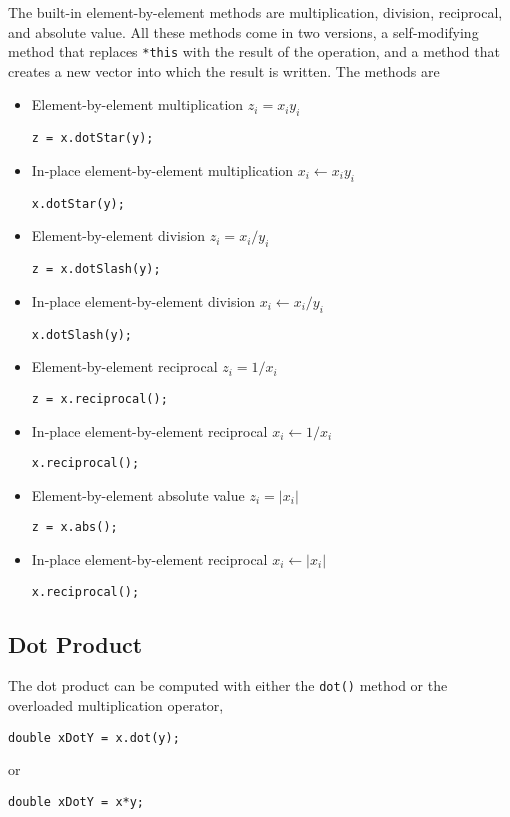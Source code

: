 \documentclass[12pt,relax]{SANDreport}
\begin{document}
The built-in element-by-element methods are multiplication, division, 
reciprocal, and absolute value. All these methods come in two versions, a
self-modifying method that replaces \verb+*this+ with the result of the 
operation, and a method that creates a new vector into which the result is
written. 
The methods are
\begin{itemize}
\item Element-by-element multiplication $z_i = x_i y_i$ 
\begin{verbatim}
z = x.dotStar(y);
\end{verbatim}
\item In-place element-by-element multiplication $x_i \leftarrow x_i y_i$ 
\begin{verbatim}
x.dotStar(y);
\end{verbatim}
\item Element-by-element division $z_i = x_i / y_i$ 
\begin{verbatim}
z = x.dotSlash(y);
\end{verbatim}
\item In-place element-by-element division $x_i \leftarrow x_i / y_i$ 
\begin{verbatim}
x.dotSlash(y);
\end{verbatim}
\item Element-by-element reciprocal $z_i = 1 / x_i$ 
\begin{verbatim}
z = x.reciprocal();
\end{verbatim}
\item In-place element-by-element reciprocal $x_i \leftarrow 1 / x_i$ 
\begin{verbatim}
x.reciprocal();
\end{verbatim}
\item Element-by-element absolute value $z_i = \vert x_i \vert$ 
\begin{verbatim}
z = x.abs();
\end{verbatim}
\item In-place element-by-element reciprocal $x_i \leftarrow \vert x_i \vert$ 
\begin{verbatim}
x.reciprocal();
\end{verbatim}
\end{itemize}


\subsection{Dot Product}

The dot product can be computed with either the \verb+dot()+ method or
the overloaded multiplication operator,
\begin{verbatim}
double xDotY = x.dot(y);
\end{verbatim}
or
\begin{verbatim}
double xDotY = x*y;
\end{verbatim}
\end{document}
